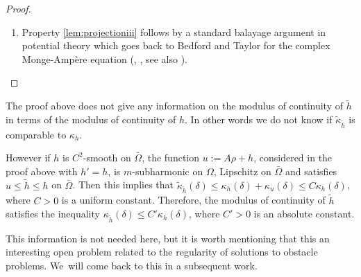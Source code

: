 \begin{proof}
\begin{enumerate}
\[\tilde{ h} (z + a) \leq \tilde h (z) + \tilde{\kappa}_{\tilde{h}} (\delta) \leq \tilde h (z) + \tilde{\kappa}_{\tilde{h}} (\delta) + \kappa_h (\delta),
\]
where $ \kappa_h (\delta)$ is the modulus of continuity of $h$ on $\bar{\Omega}$. Therefore, by the gluing principle, the function defined by
\[
v (z):=\begin{cases}
\max \{ \tilde h (z), \tilde h (z + a) - \tilde{\kappa}_{\tilde{h}} (\delta) - \kappa_h (\delta)\} &\hbox{if } z \in\Omega \cap \Omega_a \\
\tilde h (z) &\hbox{if } z \in\Omega\setminus\Omega_a
\end{cases}
\]
is $m$-subharmonic on $\Omega$ and satisfies $v \leq h$ on $\bar \Omega$. Hence $v \leq \tilde h$ on $\bar \Omega$ and then
\[
\tilde h (z + a) - \tilde{\kappa}_{\tilde{h}} (\delta) - \kappa_h (\delta) \leq \tilde h (z),
\]
for any $z \in \Omega \cap \Omega_a$ with $\vert a\vert \leq \delta$. This proves that $\tilde{h}$ is uniformly continuous on $\bar{\Omega}$.

\item
Property \eqref{lem:projectioniii} follows by a standard balayage argument in potential theory which goes back to Bedford and Taylor for the complex Monge-Ampère equation (\cite{BT76}, \cite{BT82}, see also \cite{GLZ19}).\qedhere
\end{enumerate}
\end{proof}

\begin{remark}
The proof above does not give any information on the modulus of continuity of $\tilde h$ in terms of the modulus of continuity of $h$. In other words we do not know if $\tilde{\kappa}_{\tilde h}$ is comparable to $\kappa_h$.

However if $h$ is $C^2$-smooth on $\bar \Omega$, the function $u:= A \rho + h$, considered in the proof above with $h'=h$, is $m$-subharmonic on $\Omega$, Lipschitz on $\bar{\Omega}$ and satisfies $u \leq \tilde{h} \leq h$ on $\bar{\Omega}$.
Then this implies that $\tilde{\kappa}_{\tilde{h}} (\delta) \leq \kappa_h (\delta) + \kappa_u (\delta) \leq C \kappa_h (\delta)$, where $C > 0$ is a uniform constant.
Therefore, the modulus of continuity of $\tilde h$ satisfies the inequality $\kappa_{\tilde h}(\delta) \leq C' \kappa_h(\delta)$,
where $C' > 0$ is an absolute constant.

This information is not needed here, but it is worth mentioning that this an interesting open problem related to the regularity of solutions to obstacle problems.
We~will come back to this in a subsequent work.
\end{remark}

